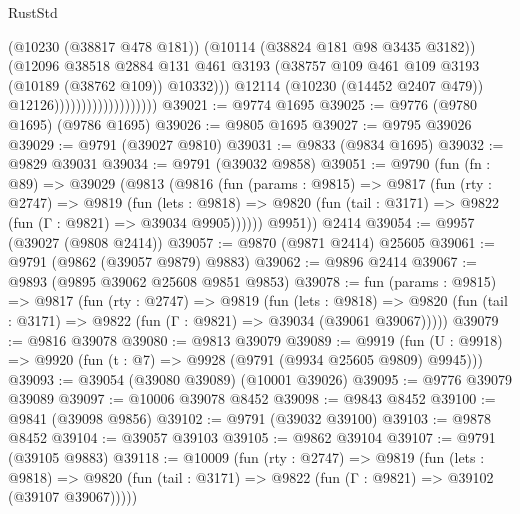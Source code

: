 \begin{lexlean}{RustStd}
\begin{coremodule}
                                            (@10230 (@38817 @478 @181))
                                            (@10114 (@38824 @181 @98 @3435 @3182))
                                            (@12096
                                              @38518
                                              @2884
                                              @131
                                              @461
                                              @3193
                                              (@38757
                                                @109
                                                @461
                                                @109
                                                @3193
                                                (@10189 (@38762 @109))
                                                @10332)))
                                          @12114
                                          (@10230 (@14452 @2407 @479))
                                          @12126)))))))))))))))))))
@39021 := @9774 @1695
@39025 := @9776 (@9780 @1695) (@9786 @1695)
@39026 := @9805 @1695
@39027 := @9795 @39026
@39029 := @9791 (@39027 @9810)
@39031 := @9833 (@9834 @1695)
@39032 := @9829 @39031
@39034 := @9791 (@39032 @9858)
@39051 := @9790
    (fun (fn : @89) =>
    @39029
      (@9813
        (@9816
          (fun (params : @9815) =>
          @9817
            (fun (rty : @2747) =>
            @9819
              (fun (lets : @9818) =>
              @9820 (fun (tail : @3171) => @9822 (fun (Γ : @9821) => @39034 @9905))))))
        @9951))
    @2414
@39054 := @9957 (@39027 (@9808 @2414))
@39057 := @9870 (@9871 @2414) @25605
@39061 := @9791 (@9862 (@39057 @9879) @9883)
@39062 := @9896 @2414
@39067 := @9893 (@9895 @39062 @25608 @9851 @9853)
@39078 := fun (params : @9815) =>
  @9817
    (fun (rty : @2747) =>
    @9819
      (fun (lets : @9818) =>
      @9820 (fun (tail : @3171) => @9822 (fun (Γ : @9821) => @39034 (@39061 @39067)))))
@39079 := @9816 @39078
@39080 := @9813 @39079
@39089 := @9919
    (fun (U : @9918) => @9920 (fun (t : @7) => @9928 (@9791 (@9934 @25605 @9809) @9945)))
@39093 := @39054 (@39080 @39089) (@10001 @39026)
@39095 := @9776 @39079 @39089
@39097 := @10006 @39078 @8452
@39098 := @9843 @8452
@39100 := @9841 (@39098 @9856)
@39102 := @9791 (@39032 @39100)
@39103 := @9878 @8452
@39104 := @39057 @39103
@39105 := @9862 @39104
@39107 := @9791 (@39105 @9883)
@39118 := @10009
    (fun (rty : @2747) =>
    @9819
      (fun (lets : @9818) =>
      @9820 (fun (tail : @3171) => @9822 (fun (Γ : @9821) => @39102 (@39107 @39067)))))

\end{coremodule}
\end{lexlean}
